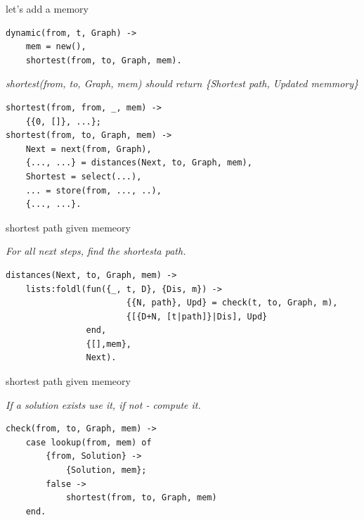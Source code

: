 \begin{frame}[fragile]{let's add a memory}

\begin{verbatim}
dynamic(from, t, Graph) ->
    mem = new(),
    shortest(from, to, Graph, mem).
\end{verbatim}

\pause\vspace{10pt}

{\em shortest(from, to, Graph, mem) should return \{Shortest path, Updated memmory\}}

\pause\vspace{10pt}
\begin{verbatim}
shortest(from, from, _, mem) ->
    {{0, []}, ...};
shortest(from, to, Graph, mem) ->
    Next = next(from, Graph),
    {..., ...} = distances(Next, to, Graph, mem),
    Shortest = select(...),
    ... = store(from, ..., ..),
    {..., ...}.
\end{verbatim}

\end{frame}

\begin{frame}[fragile]{shortest path given memeory}

\pause\vspace{10pt}

{\em For all next steps, find the shortesta path.}

\pause\vspace{10pt}

\begin{verbatim}
distances(Next, to, Graph, mem) ->
    lists:foldl(fun({_, t, D}, {Dis, m}) ->     
                        {{N, path}, Upd} = check(t, to, Graph, m),
                        {[{D+N, [t|path]}|Dis], Upd}
                end, 
                {[],mem},
                Next).    
\end{verbatim}
\end{frame}

\begin{frame}[fragile]{shortest path given memeory}

{\em If a solution exists use it, if not - compute it.}

\begin{verbatim}
check(from, to, Graph, mem) ->
    case lookup(from, mem) of
        {from, Solution} ->
            {Solution, mem};
        false ->
            shortest(from, to, Graph, mem)
    end.
\end{verbatim}
\end{frame}



